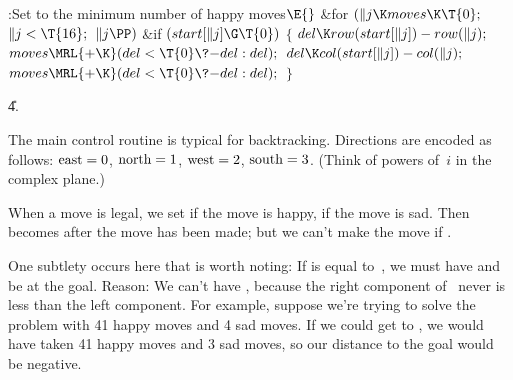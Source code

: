 \B{}:Set  to the minimum number of
happy moves\X${}\E{}$\6
\&{for} ${}(\|j\K\\{moves}\K\T{0};{}$ ${}\|j<\T{16};{}$ ${}\|j\PP){}$\1\6
\&{if} ${}(\\{start}[\|j]\G\T{0}){}$\5
${}\{{}$\1\6
${}\\{del}\K\\{row}(\\{start}[\|j])-\\{row}(\|j);{}$\6
${}\\{moves}\MRL{+{\K}}(\\{del}<\T{0}\?{-}\\{del}:\\{del});{}$\6
${}\\{del}\K\\{col}(\\{start}[\|j])-\\{col}(\|j);{}$\6
${}\\{moves}\MRL{+{\K}}(\\{del}<\T{0}\?{-}\\{del}:\\{del});{}$\6
\4${}\}{}$\2\2\par
\U4.\fi

The main control routine is typical for
backtracking.
Directions are encoded as follows: $\rm east=0$, $\rm north=1$,
$\rm west=2$, $\rm south=3$. (Think of powers of~$i$ in the complex
plane.)

When a move is legal, we set  if the move is happy,
 if the move is sad. Then  becomes  after
the move has been made; but we can't make the move if .

One subtlety occurs here that is worth noting: If  is
equal to~, we must have  and be at the goal.
Reason: We can't have , because the right component of~%
never is less than the left component.
For example, suppose we're trying
to solve the problem with 41 happy moves and 4 sad moves.
If we could get to , we would have taken 41 happy moves
and 3 sad moves, so our distance to the goal would be negative.

